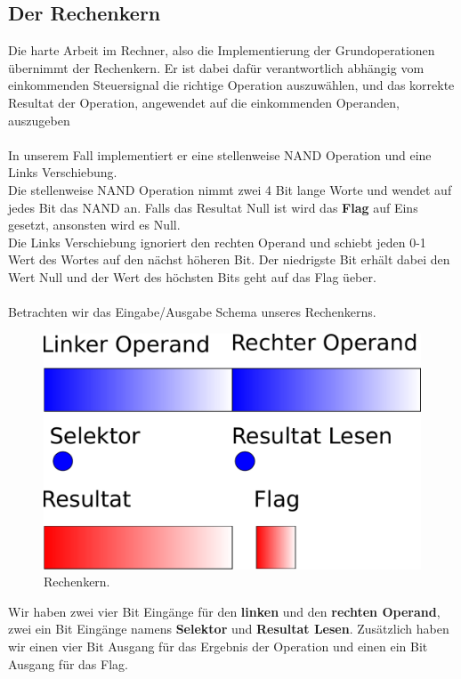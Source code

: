 \documentclass[11pt,a4paper,leqno]{report}
\numberwithin{equation}{chapter}
\begin{document}
\subsection{Der Rechenkern}
Die harte Arbeit im Rechner, also die Implementierung der Grundoperationen \"ubernimmt der Rechenkern. Er ist dabei daf\"ur verantwortlich abh\"angig vom einkommenden Steuersignal die richtige Operation auszuw\"ahlen, und das korrekte Resultat der Operation, angewendet auf die einkommenden Operanden, auszugeben\\
\\
In unserem Fall implementiert er eine stellenweise NAND Operation und eine Links Verschiebung.\\
Die stellenweise NAND Operation nimmt zwei 4 Bit lange Worte und wendet auf jedes Bit das NAND an. Falls das Resultat Null ist wird das \textbf{Flag} auf Eins gesetzt, ansonsten wird es Null.\\
Die Links Verschiebung ignoriert den rechten Operand und schiebt jeden 0-1 Wert des Wortes auf den n\"achst h\"oheren Bit. Der niedrigste Bit erh\"alt dabei den Wert Null und der Wert des h\"ochsten Bits geht auf das Flag \"ueber.\\
\\
Betrachten wir das Eingabe/Ausgabe Schema unseres Rechenkerns.
\begin{figure}[H]
	\begin{center}
		\includegraphics[scale=0.3]{Bilder/ALU.pdf}
		\caption{Rechenkern.}
	\end{center}
\end{figure}
\noindent
Wir haben zwei vier Bit Eing\"ange f\"ur den \textbf{linken} und den \textbf{rechten Operand}, zwei ein Bit Eing\"ange namens \textbf{Selektor} und \textbf{Resultat Lesen}. Zus\"atzlich haben wir einen vier Bit Ausgang f\"ur das Ergebnis der Operation und einen ein Bit Ausgang f\"ur das Flag.\\
\end{document}
